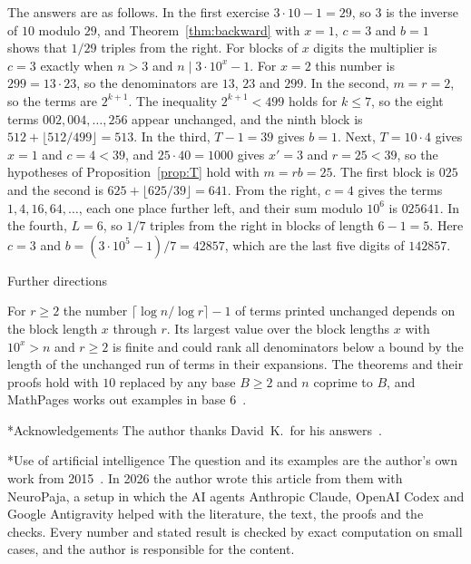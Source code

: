 \documentclass[11pt,a4paper]{amsart}
\makeatletter
\def\section{\@startsection{section}{1}%
  \z@{-.7\linespacing\@plus-\linespacing}{.5\linespacing}%
  {\normalfont\scshape\centering}}
\theoremstyle{definition}
\theoremstyle{remark}
\makeatother
\begin{document}
The answers are as follows. In the first exercise $3\cdot 10 - 1 = 29$, so $3$ is the inverse of $10$ modulo $29$, and Theorem~\ref{thm:backward} with $x = 1$, $c = 3$ and $b = 1$ shows that $1/29$ triples from the right. For blocks of $x$ digits the multiplier is $c = 3$ exactly when $n > 3$ and $n \mid 3\cdot 10^x - 1$. For $x = 2$ this number is $299 = 13\cdot 23$, so the denominators are $13$, $23$ and $299$. In the second, $m = r = 2$, so the terms are $2^{k+1}$. The inequality $2^{k+1} < 499$ holds for $k \le 7$, so the eight terms $002, 004, \dots, 256$ appear unchanged, and the ninth block is $512 + \lfloor 512/499 \rfloor = 513$. In the third, $T - 1 = 39$ gives $b = 1$. Next, $T = 10\cdot 4$ gives $x = 1$ and $c = 4 < 39$, and $25\cdot 40 = 1000$ gives $x' = 3$ and $r = 25 < 39$, so the hypotheses of Proposition~\ref{prop:T} hold with $m = rb = 25$. The first block is $025$ and the second is $625 + \lfloor 625/39 \rfloor = 641$. From the right, $c = 4$ gives the terms $1, 4, 16, 64, \dots$, each one place further left, and their sum modulo $10^6$ is $025641$. In the fourth, $L = 6$, so $1/7$ triples from the right in blocks of length $6 - 1 = 5$. Here $c = 3$ and $b = (3\cdot 10^5 - 1)/7 = 42857$, which are the last five digits of $142857$.

\section{Further directions}

For $r \ge 2$ the number $\lceil \log n/\log r \rceil - 1$ of terms printed unchanged depends on the block length $x$ through $r$. Its largest value over the block lengths $x$ with $10^x > n$ and $r \ge 2$ is finite and could rank all denominators below a bound by the length of the unchanged run of terms in their expansions. The theorems and their proofs hold
with $10$ replaced by any base $B \ge 2$ and $n$ coprime to $B$, and MathPages
works out examples in base $6$~\cite{mathpages859}.

\section*{Acknowledgements}
The author thanks David~K.\ for his answers~\cite{mse1365506,mse1372077}.

\section*{Use of artificial intelligence}
The question and its examples are the author's own work from
2015~\cite{mse1365506}. In 2026 the author wrote this article from them with
NeuroPaja, a setup in which the AI agents Anthropic Claude, OpenAI Codex and
Google Antigravity helped with the literature, the text, the proofs and the
checks. Every number and stated result is checked by exact computation on small
cases, and the author is responsible for the content.
\end{document}
